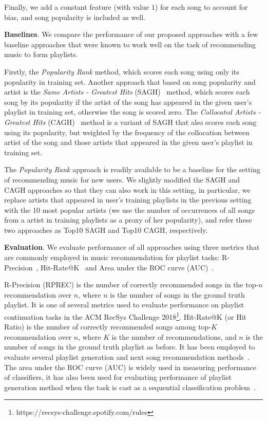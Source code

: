 Finally, we add a constant feature (with value $1$) for each song to account for bias, and song popularity is included as well.


{\bf Baselines}.
We compare the performance of our proposed approaches with a few baseline approaches
that were known to work well on the task of recommending music to form playlists.

Firstly, the {\it Popularity Rank} method, which scores each song using only its popularity in training set.
%
Another approach that based on song popularity and artist is the {\it Same Artists - Greatest Hits} (SAGH)~\cite{mcfee2012million} method,
which scores each song by its popularity if the artist of the song has appeared in the given user's playlist in training set,
otherwise the song is scored zero.
%
The {\it Collocated Artists - Greatest Hits} (CAGH)~\cite{bonnin2013evaluating} method is a variant of SAGH
that also scores each song using its popularity, but weighted by the frequency of the collocation between artist of the song
and those artists that appeared in the given user's playlist in training set.

The {\it Popularity Rank} approach is readily available to be a baseline for the setting of recommending music for new users.
%
We slightly modified the SAGH and CAGH approaches so that they can also work in this setting,
in particular, we replace artists that appeared in user's training playlists in the previous setting with the 10 most popular artists
(we use the number of occurrences of all songs from a artist in training playlists as a proxy of her popularity),
and refer these two approaches as Top10 SAGH and Top10 CAGH, respectively.



{\bf Evaluation}.
We evaluate performance of all approaches using three metrics that are commonly employed in music recommendation for playlist tasks:
R-Precision~\cite{manning2008introIR}, Hit-Rate@K~\cite{hariri2012context} and Area under the ROC curve (AUC)~\cite{manning2008introIR}.

R-Precision (RPREC) is the number of correctly recommended songs in the top-$n$ recommendation over $n$,
where $n$ is the number of songs in the ground truth playlist.
It is one of several metrics used to evaluate performance on playlist continuation tasks
in the ACM RecSys Challenge 2018\footnote{https://recsys-challenge.spotify.com/rules}.
%
Hit-Rate@K (or Hit Ratio) is the number of correctly recommended songs among top-$K$ recommendation over $n$,
where $K$ is the number of recommendations, and $n$ is the number of songs in the ground truth playlist as before.
It has been employed to evaluate several playlist generation and next song recommendation
methods~\cite{hariri2012context,bonnin2013evaluating,bonnin2015automated,jannach2015beyond}.
%
The area under the ROC curve (AUC) is widely used in measuring performance of classifiers,
it has also been used for evaluating performance of playlist generation method when the task
is cast as a sequential classification problem~\cite{ben2017groove}.

